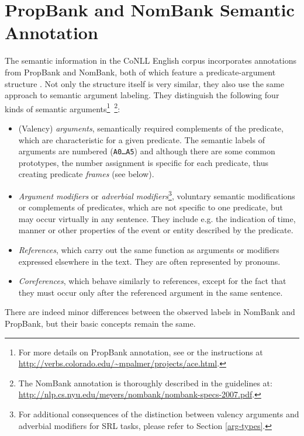 \documentclass[12pt,notitlepage]{report}
\begin{document}
\section{PropBank and NomBank Semantic Annotation}\label{propbank-nombank}

The semantic information in the CoNLL English corpus incorporates annotations from PropBank and NomBank, both of which feature a predicate-argument structure \citep[cf. Section \ref{problem} and][]{kingsbury02}. Not only the structure itself is very similar, they also use the same approach to semantic argument labeling. They distinguish the following four kinds of semantic arguments\footnote{For more details on PropBank annotation, see \citep{moreda06} or the instructions at \url{http://verbs.colorado.edu/~mpalmer/projects/ace.html}.}~\footnote{The NomBank annotation is thoroughly described in the guidelines at: \\ \url{http://nlp.cs.nyu.edu/meyers/nombank/nombank-specs-2007.pdf}.}:
\begin{itemize} 
    \item (Valency) \emph{arguments}, semantically required complements of the predicate, which are characteristic for a given predicate. The semantic labels of arguments are numbered (\texttt{A0\dots A5}) and although there are some common prototypes, the number assignment is specific for each predicate, thus creating predicate \emph{frames} (see below).
    \item \emph{Argument modifiers} or \emph{adverbial modifiers}\footnote{For additional consequences of the distinction between valency arguments and adverbial modifiers for SRL tasks, please refer to Section \ref{arg-types}.}, voluntary semantic modifications or complements of predicates, which are not specific to one predicate, but may occur virtually in any sentence. They include e.g. the indication of time, manner or other properties of the event or entity described by the predicate.
    \item \emph{References}, which carry out the same function as arguments or modifiers expressed elsewhere in the text. They are often represented by pronouns.
    \item \emph{Coreferences}, which behave similarly to references, except for the fact that they must occur only after the referenced argument in the same sentence.
\end{itemize}
There are indeed minor differences between the observed labels in NomBank and PropBank, but their basic concepts remain the same.
\end{document}
